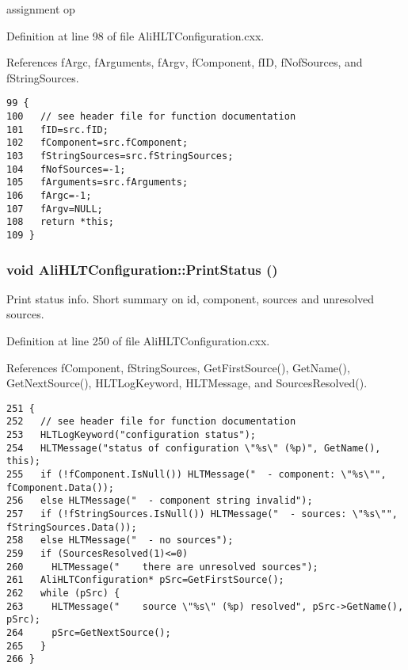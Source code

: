 assignment op 

Definition at line 98 of file Ali\-HLTConfiguration.cxx.

References f\-Argc, f\-Arguments, f\-Argv, f\-Component, f\-ID, f\-Nof\-Sources, and f\-String\-Sources.

\footnotesize\begin{verbatim}99 { 
100   // see header file for function documentation
101   fID=src.fID;
102   fComponent=src.fComponent;
103   fStringSources=src.fStringSources;
104   fNofSources=-1;
105   fArguments=src.fArguments;
106   fArgc=-1;
107   fArgv=NULL;
108   return *this;
109 }
\end{verbatim}\normalsize 


\subsubsection{\setlength{\rightskip}{0pt plus 5cm}void Ali\-HLTConfiguration::Print\-Status ()}\label{classAliHLTConfiguration_a7}


Print status info. Short summary on id, component, sources and unresolved sources. 

Definition at line 250 of file Ali\-HLTConfiguration.cxx.

References f\-Component, f\-String\-Sources, Get\-First\-Source(), Get\-Name(), Get\-Next\-Source(), HLTLog\-Keyword, HLTMessage, and Sources\-Resolved().

\footnotesize\begin{verbatim}251 {
252   // see header file for function documentation
253   HLTLogKeyword("configuration status");
254   HLTMessage("status of configuration \"%s\" (%p)", GetName(), this);
255   if (!fComponent.IsNull()) HLTMessage("  - component: \"%s\"", fComponent.Data());
256   else HLTMessage("  - component string invalid");
257   if (!fStringSources.IsNull()) HLTMessage("  - sources: \"%s\"", fStringSources.Data());
258   else HLTMessage("  - no sources");
259   if (SourcesResolved(1)<=0)
260     HLTMessage("    there are unresolved sources");
261   AliHLTConfiguration* pSrc=GetFirstSource();
262   while (pSrc) {
263     HLTMessage("    source \"%s\" (%p) resolved", pSrc->GetName(), pSrc);
264     pSrc=GetNextSource();
265   }
266 }
\end{verbatim}\normalsize 


